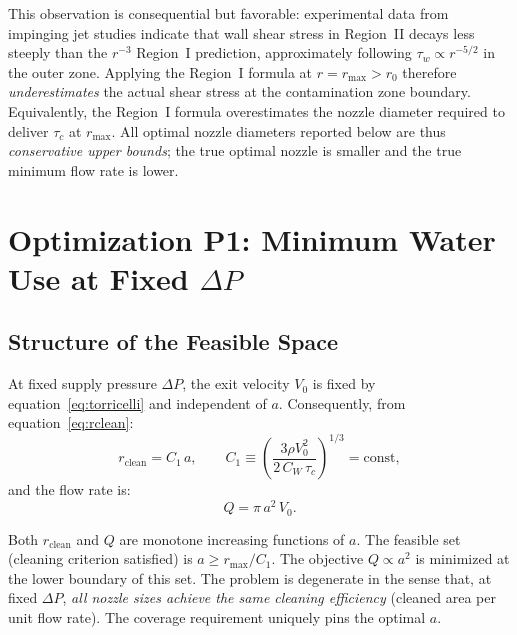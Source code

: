 \documentclass[aps,prfluids,reprint,amsmath,amssymb,floatfix]{revtex4-2}
\begin{document}
This observation is consequential but favorable: experimental data from
impinging jet studies \citep{Phares2000} indicate that wall shear stress
in Region~II decays less steeply than the $r^{-3}$ Region~I prediction,
approximately following $\tau_w \propto r^{-5/2}$ in the outer zone.
Applying the Region~I formula at $r = r_\mathrm{max} > r_0$ therefore
\emph{underestimates} the actual shear stress at the contamination zone
boundary. Equivalently, the Region~I formula overestimates the nozzle
diameter required to deliver $\tau_c$ at $r_\mathrm{max}$. All optimal
nozzle diameters reported below are thus \emph{conservative upper bounds};
the true optimal nozzle is smaller and the true minimum flow rate is lower.

\section{Optimization P1: Minimum Water Use at Fixed \texorpdfstring{$\Delta P$}{DeltaP}}
\label{sec:P1}

\subsection{Structure of the Feasible Space}
\label{subsec:P1feasible}

At fixed supply pressure $\Delta P$, the exit velocity $V_0$ is fixed
by equation~\eqref{eq:torricelli} and independent of $a$. Consequently,
from equation~\eqref{eq:rclean}:
\begin{equation}
  r_\mathrm{clean} = C_1\,a, \qquad
  C_1 \equiv \left(\frac{3\rho V_0^2}{2\,C_W\,\tau_c}\right)^{1/3} = \mathrm{const},
  \label{eq:rcleanP1}
\end{equation}
and the flow rate is:
\begin{equation}
  Q = \pi\,a^2\,V_0.
  \label{eq:QP1}
\end{equation}

Both $r_\mathrm{clean}$ and $Q$ are monotone increasing functions of $a$.
The feasible set (cleaning criterion satisfied) is $a \geq r_\mathrm{max}/C_1$.
The objective $Q \propto a^2$ is minimized at the lower boundary of this set.
The problem is degenerate in the sense that, at fixed $\Delta P$, \emph{all
nozzle sizes achieve the same cleaning efficiency} (cleaned area per unit
flow rate). The coverage requirement uniquely pins the optimal $a$.
\end{document}
